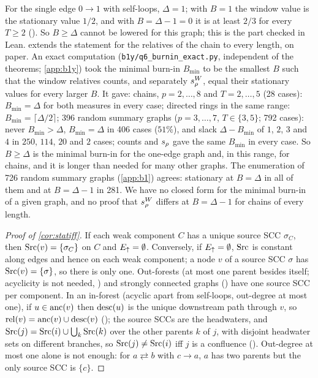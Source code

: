 \begin{remark}\label{rem:sharp}
For the single edge $0\to1$ with self-loops, $\Delta=1$; with $B=1$ the window
value is the stationary value $1/2$, and with $B=\Delta-1=0$ it is at least
$2/3$ for every $T\ge2$ (). So $B\ge\Delta$ cannot be
lowered for this graph; this is the part checked in Lean.
 extends the statement for the relatives of the chain to
every length, on paper. An exact computation (\texttt{b1y/q6\_burnin\_exact.py},
independent of the theorems; \cref{app:b1y}) took the minimal burn-in $B_{\min}$
to be the smallest $B$ such that the window relatives counts, and separately
$s_\rho^W$, equal their stationary values for every larger $B$. It gave: chains,
$p=2,\dots,8$ and $T=2,\dots,5$ (28 cases): $B_{\min}=\Delta$ for both measures
in every case; directed rings in the same range: $B_{\min}=\lceil\Delta/2\rceil$;
396 random summary graphs ($p=3,\dots,7$, $T\in\{3,5\}$; 792 cases): never
$B_{\min}>\Delta$, $B_{\min}=\Delta$ in 406 cases ($51\%$), and slack
$\Delta-B_{\min}$ of $1$, $2$, $3$ and $4$ in $250$, $114$, $20$ and $2$ cases;
counts and $s_\rho$ gave the same $B_{\min}$ in every case. So $B\ge\Delta$ is
the minimal burn-in for the one-edge graph and, in this range, for chains, and
it is longer than needed for many other graphs. The enumeration of 726 random
summary graphs (\cref{app:b1}) agrees: stationary at $B=\Delta$ in all of them
and at $B=\Delta-1$ in 281. We have no closed form for the minimal burn-in of
a given graph, and no proof that $s_\rho^W$ differs at $B=\Delta-1$ for chains of
every length.
\end{remark}

\begin{proof}[Proof of \cref{cor:statiff}]
If each weak component $C$ has a unique source SCC $\sigma_C$, then
$\mathrm{Src}(v)=\{\sigma_C\}$ on $C$ and $E_{\uparrow}=\emptyset$. Conversely, if
$E_{\uparrow}=\emptyset$, $\mathrm{Src}$ is constant along edges and hence on each weak
component; a node $v$ of a source SCC $\sigma$ has $\mathrm{Src}(v)=\{\sigma\}$, so
there is only one. Out-forests (at most one parent besides itself; acyclicity
is not needed, ) and strongly connected graphs
() have one source SCC per component. In an
in-forest (acyclic apart from self-loops, out-degree at most one), if
$u\in\mathrm{anc}(v)$ then $\mathrm{desc}(u)$ is the unique downstream path through $v$, so
$\mathrm{rel}(v)=\mathrm{anc}(v)\cup\mathrm{desc}(v)$ (); the source SCCs
are the headwaters, and $\mathrm{Src}(j)=\mathrm{Src}(i)\cup\bigcup_{k}\mathrm{Src}(k)$ over the other
parents $k$ of $j$, with disjoint headwater sets on different branches, so
$\mathrm{Src}(j)\ne\mathrm{Src}(i)$ iff $j$ is a confluence ().
Out-degree at most one alone is not enough: for $a\rightleftarrows b$ with
$c\to a$, $a$ has two parents but the only source SCC is $\{c\}$.
\end{proof}

